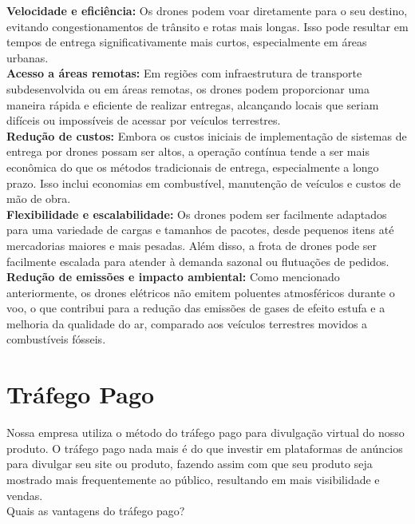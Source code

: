\textbf{Velocidade e eficiência:} Os drones podem voar diretamente para o seu destino, evitando congestionamentos de trânsito e rotas mais longas. Isso pode resultar em tempos de entrega significativamente mais curtos, especialmente em áreas urbanas.\\

\textbf{Acesso a áreas remotas:} Em regiões com infraestrutura de transporte subdesenvolvida ou em áreas remotas, os drones podem proporcionar uma maneira rápida e eficiente de realizar entregas, alcançando locais que seriam difíceis ou impossíveis de acessar por veículos terrestres.\\

\textbf{Redução de custos:} Embora os custos iniciais de implementação de sistemas de entrega por drones possam ser altos, a operação contínua tende a ser mais econômica do que os métodos tradicionais de entrega, especialmente a longo prazo. Isso inclui economias em combustível, manutenção de veículos e custos de mão de obra.\\

\textbf{Flexibilidade e escalabilidade:} Os drones podem ser facilmente adaptados para uma variedade de cargas e tamanhos de pacotes, desde pequenos itens até mercadorias maiores e mais pesadas. Além disso, a frota de drones pode ser facilmente escalada para atender à demanda sazonal ou flutuações de pedidos.\\

\textbf{Redução de emissões e impacto ambiental:} Como mencionado anteriormente, os drones elétricos não emitem poluentes atmosféricos durante o voo, o que contribui para a redução das emissões de gases de efeito estufa e a melhoria da qualidade do ar, comparado aos veículos terrestres movidos a combustíveis fósseis\cite{Ifood2022}\cite{Ifood2021}.

\section{Tráfego Pago}

Nossa empresa utiliza o método do tráfego pago para divulgação virtual do nosso produto. O tráfego pago nada mais é do que investir em plataformas de anúncios para divulgar seu site ou produto, fazendo assim com que seu produto seja mostrado mais frequentemente ao público, resultando em mais visibilidade e vendas.\\

Quais as vantagens do tráfego pago?\\

